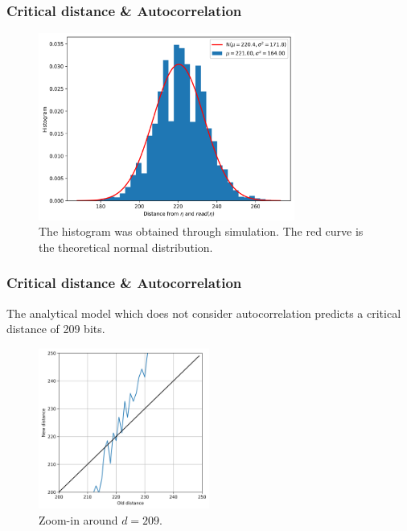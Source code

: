 \documentclass{beamer}
\begin{document}
\begin{frame}
\frametitle{Critical distance \& Autocorrelation}
\begin{figure}
\includegraphics[width=0.75\textwidth]{./images02/autocorrelation/read-random-bs.png}
\caption{The histogram was obtained through simulation. The red curve is the theoretical normal distribution.}
\end{figure}
\end{frame}


\begin{frame}
\frametitle{Critical distance \& Autocorrelation}
The analytical model which does not consider autocorrelation predicts a critical distance of 209 bits.

\begin{figure}
\centering\includegraphics[width=0.5\textwidth]{./images02/figure-73-eq-zoom.png}
\caption{Zoom-in around $d=209$.}
\end{figure}
\end{frame}
\end{document}
